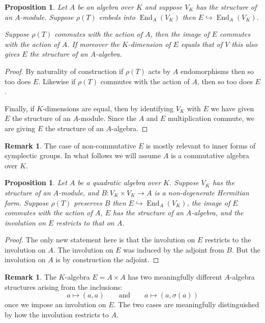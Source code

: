 \documentclass{article}
\theoremstyle{plain}
\newtheorem{proposition}[theorem]{Proposition}
\theoremstyle{definition}
\newtheorem{remark}[theorem]{Remark}
\DeclareMathOperator{\End}{End}
\begin{document}
\begin{proposition}
Let $A$ be an algebra over $K$ and suppose $V_K$ has the structure of an $A$-module.
Suppose $\rho(T)$ embeds into $\End_A(V_K)$ then $E\hookrightarrow \End_A(V_K)$.

Suppose $\rho(T)$ commutes with the action of $A$, then the image of $E$ commutes with the action of $A$.
If moreover the $K$-dimension of $E$ equals that of $V$ this also gives $E$ the structure of an $A$-algebra.
\end{proposition}
\begin{proof}
By naturality of construction if $\rho(T)$ acts by $A$ endomorphisms then so too does $E$.
Likewise if $\rho(T)$ commutes with the action of $A$, then so too does $E$.

Finally, if $K$-dimensions are equal, then by identifying $V_K$ with $E$ we have given $E$ the structure of an $A$-module. Since the $A$ and $E$ multiplication commute, we are giving $E$ the structure of an $A$-algebra.
\end{proof}
\begin{remark}
The case of non-commutative $E$ is mostly relevant to inner forms of symplectic groups.
In what follows we will assume $A$ is a commutative algebra over $K$.
\end{remark}

\begin{proposition}
Let $A$ be a quadratic algebra over $K$. Suppose $V_K$ has the structure of an $A$-module, and $B : V_K \times V_K \rightarrow A$ is a non-degenerate Hermitian form.
Suppose  $\rho(T)$ preserves $B$ then $E\hookrightarrow \End_A(V_K)$, the image of $E$ commutes with the action of $A$,  $E$ has the structure of an $A$-algebra, and the involution on $E$ restricts to that on $A$.
\end{proposition}
\begin{proof}
The only new statement here is that the involution on $E$ restricts to the involution on $A$.
The involution on $E$ was induced by the adjoint from $B$. But the involution on $A$ is by construction the adjoint.
\end{proof}
\begin{remark}
The $K$-algebra $E= A\times A$ has two meaningfully different $A$-algebra structures arising from the inclusions:
\[ a \mapsto (a,a) \qquad \text{and}\qquad a\mapsto (a,\sigma(a)) \]
once we impose an involution on $E$. The two cases are meaningfully distinguished by how the involution restricts to $A$.
\end{remark}
\end{document}
